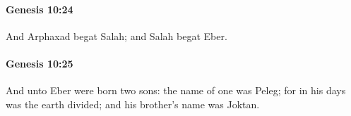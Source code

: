 		\paragraph{Genesis 10:24} %
			\label{GENESIS-10-24}

			And Arphaxad begat Salah; and Salah begat Eber.


		\paragraph{Genesis 10:25} %
			\label{GENESIS-10-25}

			And unto Eber were born two sons: the name of one was Peleg; for in his days was the earth divided; and his brother's name was Joktan.


